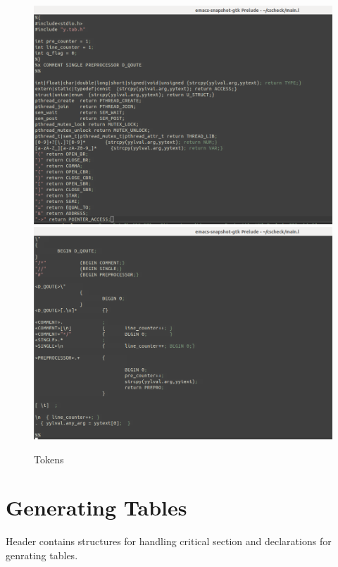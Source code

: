 \begin{figure}[H]
\centering
\includegraphics[scale=0.4]{Snaps/main_l_1.png}
\includegraphics[scale=0.4]{Snaps/main_l_2.png}
\caption{Tokens}
\label{<<Label>>}
\end{figure}
\newpage
\section{Generating Tables}
Header contains structures for handling critical section and declarations	
for genrating tables.								
											
